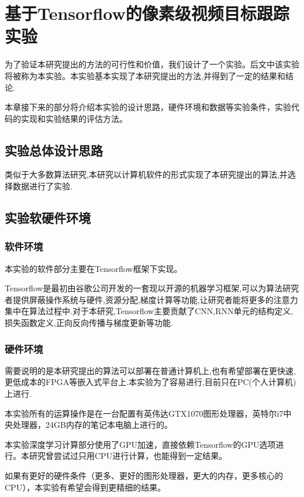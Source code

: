 
\chapter{基于Tensorflow的像素级视频目标跟踪实验} \label{section:experiment}
为了验证本研究提出的方法的可行性和价值，我们设计了一个实验。后文中该实验将被称为本实验。本实验基本实现了本研究提出的方法,并得到了一定的结果和结论.
\par
本章接下来的部分将介绍本实验的设计思路，硬件环境和数据等实验条件，实验代码的实现和实验结果的评估方法。

\section{实验总体设计思路}
类似于大多数算法研究,本研究以计算机软件的形式实现了本研究提出的算法,并选择数据进行了实验.

\section{实验软硬件环境}
\subsection{软件环境}
本实验的软件部分主要在Tensorflow\supercite{abadi2016tensorflow}框架下实现。
\par
Tensorflow是最初由谷歌公司开发的一套现以开源的机器学习框架,可以为算法研究者提供屏蔽操作系统与硬件,资源分配,梯度计算等功能,让研究者能将更多的注意力集中在算法过程中.对于本研究,Tensorflow主要贡献了CNN,RNN单元的结构定义,损失函数定义,正向反向传播与梯度更新等功能.

\subsection{硬件环境}
\par
需要说明的是本研究提出的算法可以部署在普通计算机上,也有希望部署在更快速,更低成本的FPGA等嵌入式平台上.本实验为了容易进行,目前只在PC(个人计算机)上进行.
\par
本实验所有的运算操作是在一台配置有英伟达GTX1070图形处理器，英特尔i7中央处理器，24GB内存的笔记本电脑上进行的。
\par
本实验深度学习计算部分使用了GPU加速，直接依赖Tensorflow的GPU选项进行。本研究曾尝试过只用CPU进行计算，也能得到一定结果。
\par
如果有更好的硬件条件（更多、更好的图形处理器，更大的内存，更多核心的CPU），本实验有希望会得到更精细的结果。

